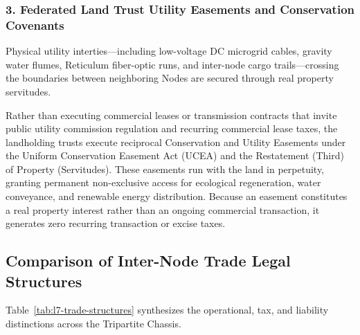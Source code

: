 \subsubsection{3. Federated Land Trust Utility Easements and Conservation Covenants}
Physical utility interties—including low-voltage DC microgrid cables, gravity water flumes, Reticulum fiber-optic runs, and inter-node cargo trails—crossing the boundaries between neighboring Nodes are secured through real property servitudes.

Rather than executing commercial leases or transmission contracts that invite public utility commission regulation and recurring commercial lease taxes, the landholding trusts execute reciprocal Conservation and Utility Easements under the Uniform Conservation Easement Act (UCEA) and the Restatement (Third) of Property (Servitudes). These easements run with the land in perpetuity, granting permanent non-exclusive access for ecological regeneration, water conveyance, and renewable energy distribution. Because an easement constitutes a real property interest rather than an ongoing commercial transaction, it generates zero recurring transaction or excise taxes.

\subsection{Comparison of Inter-Node Trade Legal Structures}

Table~\ref{tab:l7-trade-structures} synthesizes the operational, tax, and liability distinctions across the Tripartite Chassis.

